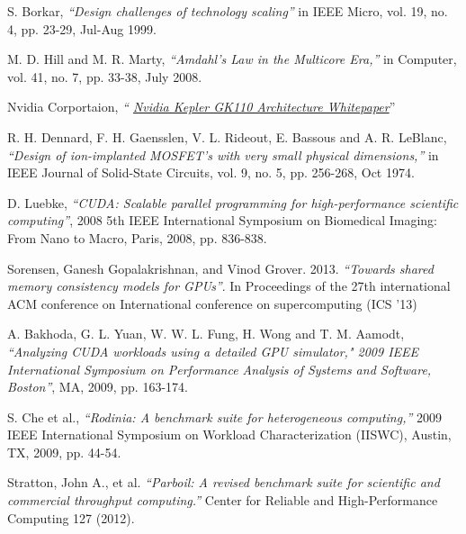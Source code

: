 \documentclass{thesis}
\begin{document}
{{\begin{thebibliography}{1}
\begin{LTRitems}
\setpersianfont{}\resetlatinfont
\newblock S. Borkar, {\itshape``Design challenges of technology scaling''} in
IEEE Micro,
vol.
19,
no. 4, pp. 23-29, Jul-Aug 1999.

\setpersianfont{}\resetlatinfont
\newblock M. D. Hill and M. R. Marty, {\itshape``Amdahl's Law in the Multicore
Era,''} in
Computer,
vol. 41, no. 7, pp. 33-38, July 2008.

\setpersianfont{}\resetlatinfont
\newblock Nvidia Corportaion, {\itshape``
\href{https://www.nvidia.com/content/PDF/kepler/NVIDIA-Kepler
-GK110-Architecture-Whitepaper.pdf}{Nvidia Kepler GK110 Architecture
Whitepaper}}''


\setpersianfont{}\resetlatinfont
\newblock R. H. Dennard, F. H. Gaensslen, V. L. Rideout, E. Bassous and A. R.
LeBlanc, {\itshape``Design of ion-implanted MOSFET's with very small physical
dimensions,''} in IEEE Journal of Solid-State Circuits, vol. 9, no. 5, pp.
256-268, Oct 1974.

\setpersianfont{}\resetlatinfont
\newblock D. Luebke, {\itshape ``CUDA: Scalable parallel programming for
high-performance
scientific
computing''}, 2008 5th IEEE International Symposium on Biomedical Imaging: From
Nano to Macro, Paris, 2008, pp. 836-838.

\setpersianfont{}\resetlatinfont
\newblockTyler Sorensen, Ganesh Gopalakrishnan, and Vinod Grover. 2013.
{\itshape ``Towards
shared
memory consistency models for GPUs''}. In Proceedings of the 27th international
ACM conference on International conference on supercomputing (ICS '13)

\setpersianfont{}\resetlatinfont
\newblock A. Bakhoda, G. L. Yuan, W. W. L. Fung, H. Wong and T. M. Aamodt,
{\itshape ``Analyzing
CUDA workloads using a detailed GPU simulator," 2009 IEEE International
Symposium on Performance Analysis of Systems and Software, Boston''}, MA, 2009,
pp. 163-174.

\setpersianfont{}\resetlatinfont
\newblock S. Che et al., {\itshape ``Rodinia: A benchmark suite for
heterogeneous
computing,''} 2009
IEEE International Symposium on Workload Characterization (IISWC), Austin, TX,
2009, pp. 44-54.

\setpersianfont{}\resetlatinfont
\newblock Stratton, John A., et al. {\itshape ``Parboil: A revised benchmark
suite
for
scientific
and commercial throughput computing.''} Center for Reliable and
High-Performance
Computing 127 (2012).


\end{LTRitems}
\end{thebibliography}}}
\end{document}
